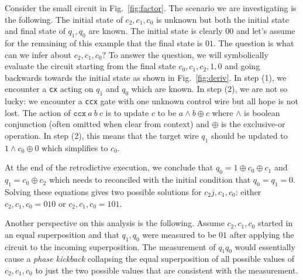 \documentclass{article}
\begin{document}
Consider the small circuit in Fig.~\ref{fig:factor}. The scenario we are investigating is the following. The initial state of $c_2,c_1,c_0$ is unknown but both the initial state and final state of $q_1,q_0$ are known. The initial state is clearly $00$ and let's assume for the remaining of this example that the final state is $01$. The question is what can we infer about $c_2,c_1,c_0$? To answer the question, we will symbolically evaluate the circuit starting from the final state $c_0,c_1,c_2,1,0$ and going backwards towards the initial state as shown in Fig.~\ref{fig:deriv}. In step (1), we encounter a \texttt{cx} acting on $q_1$ and $q_0$ which are known. In step (2), we are not so lucky: we encounter a \texttt{ccx} gate with one unknown control wire but all hope is not lost. The action of $\texttt{ccx}~a~b~c$ is to update $c$ to be $a \wedge b \oplus c$ where $\wedge$ is boolean conjunction (often omitted when clear from context) and $\oplus$ is the exclusive-or operation. In step (2), this means that the target wire $q_1$ should be updated to $1 \wedge c_0 \oplus 0$ which simplifies to $c_0$. 

At the end of the retrodictive execution, we conclude that $q_0 = 1 \oplus c_0 \oplus c_1$ and $q_1 = c_0 \oplus c_2$ which needs to reconciled with the initial condition that $q_0 = q_1 = 0$. Solving these equations gives two possible solutions for $c_2j,c_1,c_0$: either $c_2,c_1,c_0 = 010$ or $c_2,c_1,c_0 = 101$.

Another perspective on this analysis is the following. Assume $c_2,c_1,c_0$ started in an equal superposition and that $q_1,q_0$ were measured to be $01$ after applying the circuit to the incoming superposition. The measurement of $q_1q_0$ would essentially cause a \emph{phase kickback} collapsing the equal superposition of all possible values of $c_2,c_1,c_0$ to just the two possible values that are consistent with the measurement. 
\end{document}
